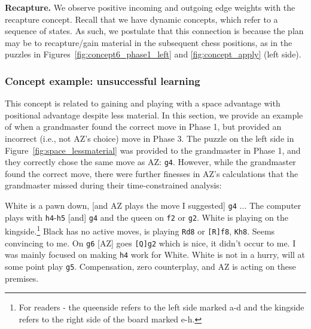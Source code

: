 \documentclass{article}
\newcommand{\ct}[1]{\texttt{#1}}
\begin{document}
\textbf{Recapture.} We observe positive incoming and outgoing edge weights with the recapture concept. Recall that we have dynamic concepts, which refer to a sequence of states. As such, we postulate that this connection is because the plan may be to recapture/gain material in the subsequent chess positions, as in the puzzles in Figures~\ref{fig:concept6_phase1_left} and \ref{fig:concept_apply} (left side). 

\subsubsection{Concept example: unsuccessful learning} 
This concept is related to gaining and playing with a space advantage with positional advantage despite less material. 
In this section, we provide an example of when a grandmaster found the correct move in Phase 1, but provided an incorrect (i.e., not AZ's choice) move in Phase 3. 
The puzzle on the left side in Figure~\ref{fig:space_lessmaterial} was provided to the grandmaster in Phase 1, and they correctly chose the same move as AZ: \ct{g4}.
However, while the grandmaster found the correct move, there were further finesses in AZ's calculations that the grandmaster missed during their time-constrained analysis:
\begin{displayquote}
White is a pawn down, [and AZ plays the move I suggested] \ct{g4} ... The computer plays with \ct{h4}-\ct{h5} [and] \ct{g4} and the queen on \ct{f2} or \ct{g2}. White is playing on the kingside.\footnote{For readers - the queenside refers to the left side marked a-d and the kingside refers to the right side of the board marked e-h.} Black has no active moves, is playing \ct{Rd8} or \ct{[R]f8}, \ct{Kh8}. Seems convincing to me. On \ct{g6} [AZ] goes \ct{[Q]g2} which is nice, it didn’t occur to me. I was mainly focused on making \ct{h4} work for White. White is not in a hurry, will at some point play \ct{g5}. Compensation, zero counterplay, and AZ is acting on these premises.
\end{displayquote}
\end{document}
